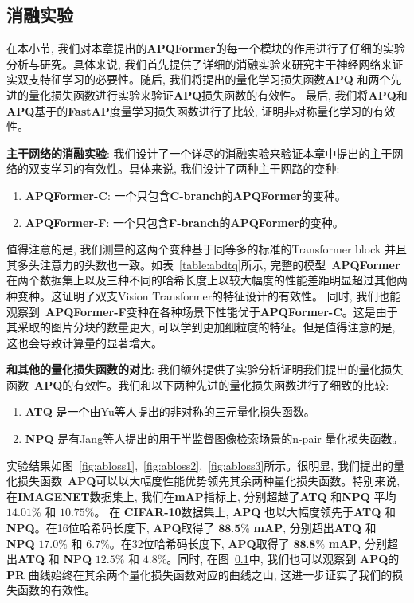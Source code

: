 \subsection{消融实验}
在本小节, 我们对本章提出的\textbf{APQFormer}的每一个模块的作用进行了仔细的实验分析与研究。具体来说, 我们首先提供了详细的消融实验来研究主干神经网络来证实双支特征学习的必要性。随后, 我们将提出的量化学习损失函数\textbf{APQ} 和两个先进的量化损失函数进行实验来验证\textbf{APQ}损失函数的有效性。 最后, 我们将\textbf{APQ}和\textbf{APQ}基于的\textbf{FastAP}度量学习损失函数进行了比较, 证明非对称量化学习的有效性。\par
\textbf{主干网络的消融实验}: 我们设计了一个详尽的消融实验来验证本章中提出的主干网络的双支学习的有效性。具体来说, 我们设计了两种主干网路的变种:
\begin{enumerate}
    \item \textbf{APQFormer-C}: 一个只包含\textbf{C-branch}的\textbf{APQFormer}的变种。
    \item \textbf{APQFormer-F}: 一个只包含\textbf{F-branch}的\textbf{APQFormer}的变种。
\end{enumerate}
值得注意的是, 我们测量的这两个变种基于同等多的标准的Transformer block 并且其多头注意力的头数也一致。如表~\ref{table:abdtq}所示, 完整的模型~\textbf{APQFormer} 在两个数据集上以及三种不同的哈希长度上以较大幅度的性能差距明显超过其他两种变种。这证明了双支Vision Transformer的特征设计的有效性。 同时, 我们也能观察到~\textbf{APQFormer-F}变种在各种场景下性能优于\textbf{APQFormer-C}。这是由于其采取的图片分块的数量更大, 可以学到更加细粒度的特征。但是值得注意的是, 这也会导致计算量的显著增大。\par
\textbf{和其他的量化损失函数的对比}:  我们额外提供了实验分析证明我们提出的量化损失函数~\textbf{APQ}的有效性。我们和以下两种先进的量化损失函数进行了细致的比较:
\begin{enumerate}
    \item \textbf{ATQ} 是一个由Yu等人\cite{yu2018product}提出的非对称的三元量化损失函数。
    \item \textbf{NPQ} 是有Jang等人\cite{jang2020generalized}提出的用于半监督图像检索场景的n-pair 量化损失函数。
\end{enumerate}
实验结果如图~\ref{fig:abloss1},~\ref{fig:abloss2},~\ref{fig:abloss3}所示。很明显, 我们提出的量化损失函数~\textbf{APQ}可以以大幅度性能优势领先其余两种量化损失函数。特别来说, 在\textbf{IMAGENET}数据集上, 我们在\textbf{mAP}指标上, 分别超越了\textbf{ATQ} 和\textbf{NPQ} 平均 \textbf{$14.01$}\% 和 \textbf{$10.75$}\%。 在 \textbf{CIFAR-10}数据集上, \textbf{APQ} 也以大幅度领先于\textbf{ATQ} 和 \textbf{NPQ}。在16位哈希码长度下, \textbf{APQ}取得了 $\textbf{88.5\%}$ \textbf{mAP}, 分别超出\textbf{ATQ} 和 \textbf{NPQ} $17.0\%$ 和 $6.7 \%$。在32位哈希码长度下, \textbf{APQ}取得了 $\textbf{88.8\%}$ \textbf{mAP}, 分别超出\textbf{ATQ} 和 \textbf{NPQ} $12.5\%$ 和 $4.8 \%$。同时, 在图~\ref{}中, 我们也可以观察到 \textbf{APQ}的 \textbf{PR} 曲线始终在其余两个量化损失函数对应的曲线之山, 这进一步证实了我们的损失函数的有效性。\par
